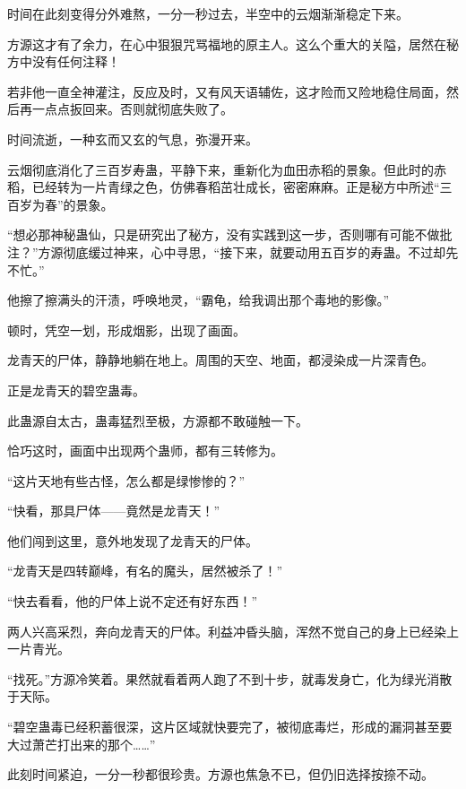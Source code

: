 
\begin{this_body}



时间在此刻变得分外难熬，一分一秒过去，半空中的云烟渐渐稳定下来。

方源这才有了余力，在心中狠狠咒骂福地的原主人。这么个重大的关隘，居然在秘方中没有任何注释！

若非他一直全神灌注，反应及时，又有风天语辅佐，这才险而又险地稳住局面，然后再一点点扳回来。否则就彻底失败了。

时间流逝，一种玄而又玄的气息，弥漫开来。

云烟彻底消化了三百岁寿蛊，平静下来，重新化为血田赤稻的景象。但此时的赤稻，已经转为一片青绿之色，仿佛春稻茁壮成长，密密麻麻。正是秘方中所述“三百岁为春”的景象。

“想必那神秘蛊仙，只是研究出了秘方，没有实践到这一步，否则哪有可能不做批注？”方源彻底缓过神来，心中寻思，“接下来，就要动用五百岁的寿蛊。不过却先不忙。”

他擦了擦满头的汗渍，呼唤地灵，“霸龟，给我调出那个毒地的影像。”

顿时，凭空一划，形成烟影，出现了画面。

龙青天的尸体，静静地躺在地上。周围的天空、地面，都浸染成一片深青色。

正是龙青天的碧空蛊毒。

此蛊源自太古，蛊毒猛烈至极，方源都不敢碰触一下。

恰巧这时，画面中出现两个蛊师，都有三转修为。

“这片天地有些古怪，怎么都是绿惨惨的？”

“快看，那具尸体——竟然是龙青天！”

他们闯到这里，意外地发现了龙青天的尸体。

“龙青天是四转巅峰，有名的魔头，居然被杀了！”

“快去看看，他的尸体上说不定还有好东西！”

两人兴高采烈，奔向龙青天的尸体。利益冲昏头脑，浑然不觉自己的身上已经染上一片青光。

“找死。”方源冷笑着。果然就看着两人跑了不到十步，就毒发身亡，化为绿光消散于天际。

“碧空蛊毒已经积蓄很深，这片区域就快要完了，被彻底毒烂，形成的漏洞甚至要大过萧芒打出来的那个……”

此刻时间紧迫，一分一秒都很珍贵。方源也焦急不已，但仍旧选择按捺不动。


\end{this_body}
